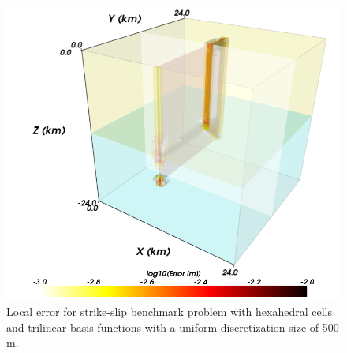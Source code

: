 \noindent \begin{center}
\begin{figure}
\begin{centering}
\includegraphics[scale=0.33]{benchmarks/strikeslip/figs/error_hex8_0500m}
\par\end{centering}

\caption{Local error for strike-slip benchmark problem with hexahedral cells
and trilinear basis functions with a uniform discretization size of
500 m.\label{fig:benchmark:strikeslip:hex8:500m}}
\end{figure}

\par\end{center}

